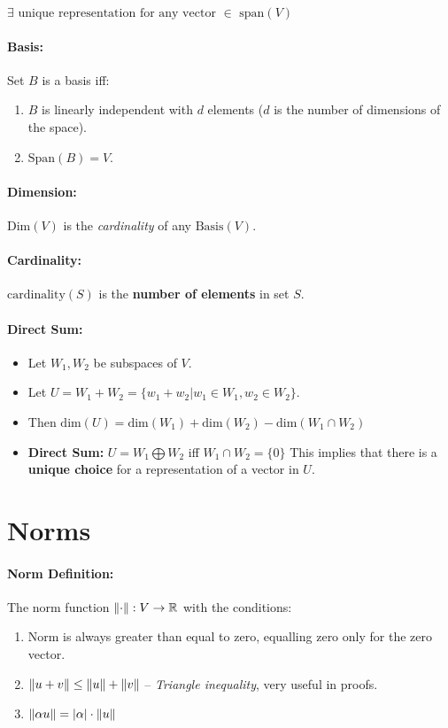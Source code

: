 \documentclass[a4paper,12pt]{report}
\DeclarePairedDelimiter\abs{\lvert}{\rvert}%
\DeclarePairedDelimiter\norm{\lVert}{\rVert}%
\def\reals{\mathbb{R}}
\begin{document}
$\exists \text{ unique representation for any vector } \in \text{ span}(V)$

\paragraph{Basis: } Set $B$ is a basis iff: 
\begin{enumerate}
\item $B$ is linearly independent with $d$ elements ($d$ is the number of dimensions of the space).
\item $\text{Span}(B) = V$.
\end{enumerate}

\paragraph{Dimension: } $\text{Dim}(V)$ is the \textit{cardinality} of any $\text{Basis}(V)$. 

\paragraph{Cardinality: } $\text{cardinality}(S)$ is the \textbf{number of elements} in set $S$.

\paragraph{Direct Sum: } 
\begin{itemize}
\item Let $W_1, W_2$ be subspaces of $V$.
\item Let $U = W_1 + W_2 = \{w_1 + w_2 | w_1 \in W_1, w_2 \in W_2\}$.
\item Then $\text{dim}(U) = \text{dim}(W_1) + \text{dim}(W_2) - \text{dim}(W_1 \cap W_2)$
\item \textbf{Direct Sum: } $U = W_1 \bigoplus W_2$ iff $W_1 \cap W_2 = \{0\}$
This implies that there is a \textbf{unique choice} for a representation of a vector in $U$.
\end{itemize}

\section{Norms}

\paragraph{Norm Definition: } The norm function $\norm{\cdot}: V\to \reals$ with the conditions:
\begin{enumerate}
\item Norm is always greater than equal to zero, equalling zero only for the zero vector.
\item $\norm{u+v} \leq \norm{u} + \norm{v}$ -- \textit{Triangle inequality}, very useful in proofs. 
\item $\norm{\alpha u} = \abs{\alpha} \cdot \norm{u}$
\end{enumerate}
\end{document}
